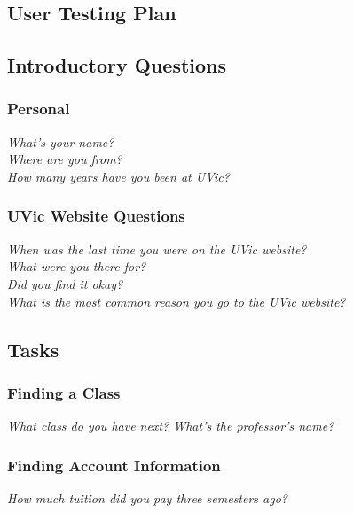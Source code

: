 \documentclass{article}
\begin{document}
\pagebreak
\begin{appendices}

\section{User Testing Plan}\label{ap:utesting}

\subsection*{Introductory Questions}\label{introductory-questions}
\subsubsection*{Personal}\label{personal}
\emph{What's your name?} \\
\emph{Where are you from?} \\
\emph{How many years have you been at UVic?} \\
\subsubsection*{UVic Website Questions}\label{uvic-website-questions}
\emph{When was the last time you were on the UVic website?} \\
\emph{What were you there for?} \\
\emph{Did you find it okay?} \\
\emph{What is the most common reason you go to the UVic website?} \\
\subsection*{Tasks}\label{tasks}
\subsubsection*{Finding a Class}\label{finding-a-class}
\emph{What class do you have next? What's the professor's name?} \\
\subsubsection*{Finding Account Information}\label{finding-account-information}
\emph{How much tuition did you pay three semesters ago?} \\

\end{appendices}
\end{document}
